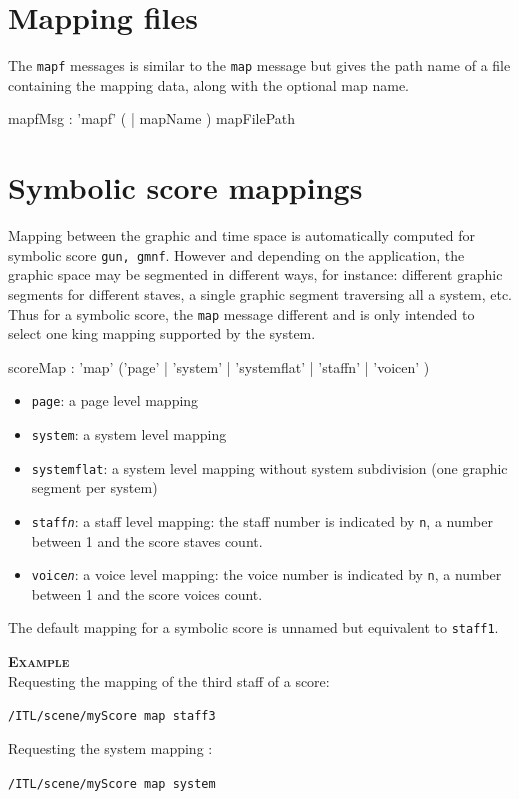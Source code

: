 \documentclass[a4paper,twoside]{report}
\newcommand{\sublevel}[1]	{\section{#1}}
\newcommand{\OSC}[1]		{\texttt{#1}}
\newcommand{\example}		{\textbf{\hspace{-1.5cm}\textbf{\textsc{Example }}}}
\newcommand{\sample}	[1]			{\vspace{-2mm}\begin{center}\colorbox{mygrey}{
								\begin{minipage}[t]{0.9\columnwidth} 
								{\small \texttt{#1}}
								\end{minipage}}\end{center}}
\begin{document}
\sublevel{Mapping files}
\label{mapFileMsg}
The \OSC{mapf} messages is similar to the \OSC{map} message but gives the path name of a file containing the mapping data, along with the optional map name.
\begin{rail}
mapfMsg : 'mapf' ( | mapName ) mapFilePath
\end{rail}



\sublevel{Symbolic score mappings}
\label{guidomap}

Mapping between the graphic and time space is automatically computed for symbolic score \OSC{gun, gmnf}. However and depending on the application, the graphic space may be segmented in different ways, for instance: different graphic segments for different staves, a single graphic segment traversing all a system, etc. Thus for a symbolic score, the \OSC{map} message different and is only intended to select one king mapping supported by the system.

\begin{rail}
scoreMap : 'map' ('page' | 'system' | 'systemflat' | 'staffn' | 'voicen' )
\end{rail}

\begin{itemize}
\item \OSC{page}: a page level mapping
\item \OSC{system}: a system level mapping
\item \OSC{systemflat}: a system level mapping without system subdivision (one graphic segment per system)
\item \OSC{staff\textit{n}}: a staff level mapping: the staff number is indicated by \OSC{n}, a number between 1 and the score staves count.
\item \OSC{voice\textit{n}}: a voice level mapping: the voice number is indicated by \OSC{n}, a number between 1 and the score voices count.
\end{itemize}

The default mapping for a symbolic score is unnamed but equivalent to \OSC{staff1}.

\example \\
Requesting the mapping of the third staff of a score:
\sample{/ITL/scene/myScore map staff3}
Requesting the system mapping :
\sample{/ITL/scene/myScore map system}
\end{document}
